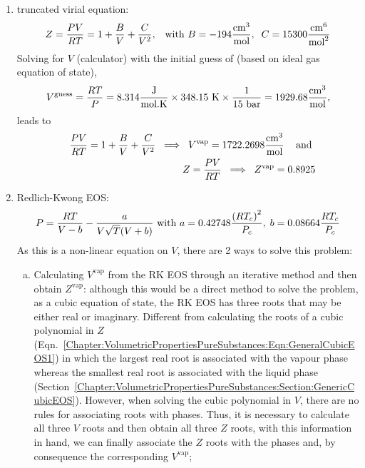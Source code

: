 \begin{probsol}
     \begin{enumerate}[1.]
%
        \item truncated virial equation:
            \begin{displaymath}
               Z =  \displaystyle\frac{PV}{RT}=1+\displaystyle\frac{B}{V}+\displaystyle\frac{C}{V^{2}}, \;\;\;\text{with } B=-194\displaystyle\frac{\text{cm}^{3}}{\text{mol}},\;\;C=15300 \displaystyle\frac{\text{cm}^{6}}{\text{mol}^{2}}
            \end{displaymath}
            Solving for $V$ (calculator) with the initial guess of (based on ideal gas equation of state),
            \begin{displaymath}
               V^{\text{guess}} = \displaystyle\frac{RT}{P} = 8.314 \displaystyle\frac{\text{J}}{\text{mol.K}} \times 348.15\text{ K} \times \displaystyle\frac{1}{15\text{ bar}} = 1929.68 \displaystyle\frac{\text{cm}^{3}}{\text{mol}},
            \end{displaymath}
            leads to
            \begin{eqnarray}
               &&\displaystyle\frac{PV}{RT}=1+\displaystyle\frac{B}{V}+\displaystyle\frac{C}{V^{2}} \;\;\Longrightarrow \;\; V^{\text{vap}} = 1722.2698 \displaystyle\frac{\text{cm}^{3}}{\text{mol}}\;\;\;\text{ and } \nonumber \\
               && Z =  \displaystyle\frac{PV}{RT} \;\;\Longrightarrow \;\; Z^{\text{vap}} = 0.8925 \nonumber
            \end{eqnarray}
%
        \item Redlich-Kwong EOS:
            \begin{displaymath}
               P = \displaystyle\frac{RT}{V-b} - \displaystyle\frac{a}{V\sqrt{T}(V+b)}\text{ with } a = 0.42748\displaystyle\frac{\left(R T_{c}\right)^{2}}{P_{c}},\; b = 0.08664\displaystyle\frac{R T_{c}}{P_{c}}
            \end{displaymath}
            As this is a non-linear equation on $V$, there are 2 ways to solve this problem:
            \begin{enumerate}[a)]
               \item Calculating $V^{\text{vap}}$ from the RK EOS through an iterative method and then obtain $Z^{\text{vap}}$: although this would be a direct method to solve the problem, as a cubic equation of state, the RK EOS has three roots that may be either real or imaginary. Different from calculating the roots of a cubic polynomial in $Z$ (Eqn.~\ref{Chapter:VolumetricPropertiesPureSubstances:Eqn:GeneralCubicEOS1}) in which the largest real root is associated with the vapour phase whereas the smallest real root is associated with the liquid phase (Section~\ref{Chapter:VolumetricPropertiesPureSubstances:Section:GenericCubicEOS}). However, when solving the cubic polynomial in $V$, there are no rules for associating roots with phases. Thus, it is necessary to calculate all three $V$ roots and then obtain all three $Z$ roots, with this information in hand, we can finally associate the $Z$ roots with the phases and, by consequence the corresponding $V^{\text{vap}}$;

\end{enumerate}
\end{enumerate}
\end{probsol}
